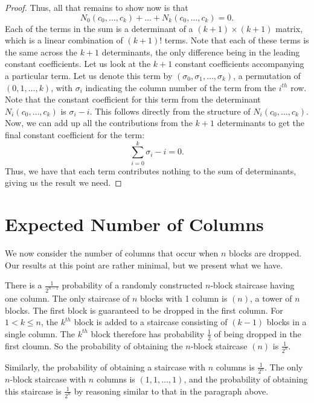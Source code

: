 \documentclass[12pt]{amsart}
\newcommand{\N}{N}
\newcommand{\newsection}[2]{
\section{#1 \label{#2}}
}
\begin{document}
\begin{proof}
Thus, all that remains to show now is that
$$
\N_0(c_0,\dots,c_k) + \dots + \N_k(c_0,\dots,c_k) = 0.
$$
Each of the terms in the sum is a determinant of a $(k+1)\times(k+1)$ matrix, which is a linear combination of $(k+1)!$ terms. Note that each of these terms is the same across the $k+1$ determinants, the only difference being in the leading constant coefficients. Let us look at the $k+1$ constant coefficients accompanying a particular term. Let us denote this term by $(\sigma_0, \sigma_1, \dots, \sigma_k)$, a permutation of $(0, 1, \dots, k)$, with $\sigma_i$ indicating the column number of the term from the $i^{th}$ row. Note that the constant coefficient for this term from the determinant $\N_i(c_0,\dots,c_k)$ is $\sigma_i - i$. This follows directly from the structure of $\N_i(c_0,\dots,c_k)$. Now, we can add up all the contributions from the $k+1$ determinants to get the final constant coefficient for the term:
$$
\sum_{i=0}^{k}{\sigma_i-i} = 0.
$$
Thus, we have that each term contributes nothing to the sum of determinants, giving us the result we need.

\end{proof}

\newsection{Expected Number of Columns}{sec:expectedcolumns}
We now consider the number of columns that occur when $n$ blocks are dropped. Our results at this point are rather minimal, but we present what we have.

There is a $\frac{1}{2^{n-1}}$ probability of a randomly constructed $n$-block staircase having one column. The only staircase of $n$ blocks with 1 column is $(n)$, a tower of $n$ blocks. The first block is guaranteed to be dropped in the first column. For $1<k \leq n$, the $k^{th}$ block is added to a staircase consisting of $(k-1)$ blocks in a single column. The $k^{th}$ block therefore has probability $\frac{1}{2}$ of being dropped in the first cloumn. So the probability of obtaining the $n$-block staircase $(n)$ is $\frac{1}{2^n}$.

Similarly, the probability of obtaining a staircase with $n$ columns is $\frac{1}{2^{n}}$. The only $n$-block staircase with $n$ columns is $(1, 1, \ldots, 1)$, and the probability of obtaining this staircase is $\frac{1}{2^{n}}$ by reasoning similar to that in the paragraph above.
\end{document}
